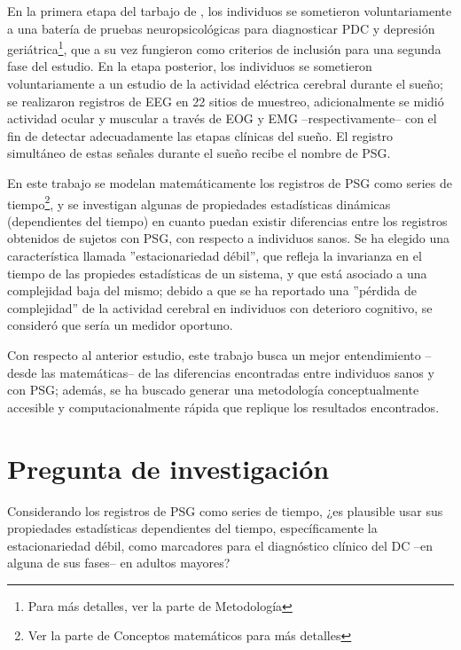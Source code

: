 En la primera etapa del tarbajo de \cite{VazquezTagle16},
los individuos se sometieron voluntariamente a una bater\'ia de pruebas
neuropsicol\'ogicas para diagnosticar PDC y depresi\'on geri\'atrica\footnote{Para
m\'as detalles, ver la parte de Metodolog\'ia}, que a su vez fungieron como criterios de
inclusi\'on para una segunda fase del estudio.
En la etapa posterior, los individuos se sometieron voluntariamente a un estudio de la
actividad el\'ectrica cerebral durante el
sue\~no; se realizaron
registros de EEG en 22 sitios de muestreo, adicionalmente se midi\'o
actividad ocular y muscular a trav\'es de EOG y EMG --respectivamente-- con
el fin de detectar adecuadamente las etapas cl\'inicas del sue\~no\cite{AASM07}.
El registro simult\'aneo de estas se\~nales durante el sue\~no recibe el nombre de PSG.

En este trabajo se modelan matem\'aticamente los registros de PSG como series de 
tiempo\footnote{Ver la parte de Conceptos matem\'aticos para m\'as detalles}, y se
investigan algunas de propiedades estad\'isticas din\'amicas (dependientes del tiempo)
en cuanto puedan existir diferencias entre los registros obtenidos de sujetos con PSG,
con respecto a individuos sanos. Se ha elegido una caracter\'istica
llamada ''estacionariedad d\'ebil'', que refleja la invarianza en el tiempo de las propiedes
estad\'isticas de un sistema, y que est\'a asociado a una complejidad baja del mismo; 
debido a que se ha reportado una ''p\'erdida de complejidad'' de la actividad cerebral
en individuos con deterioro cognitivo, se consider\'o que ser\'ia un medidor oportuno. 

Con respecto al anterior estudio, este trabajo busca un mejor
entendimiento --desde las matem\'aticas-- de las diferencias encontradas entre 
individuos sanos y con PSG; adem\'as, se ha buscado generar una metodolog\'ia 
conceptualmente accesible y computacionalmente r\'apida que replique los resultados encontrados.


\section{Pregunta de investigaci\'on}

Considerando los registros de PSG como series de tiempo,
¿es plausible usar sus propiedades estad\'isticas dependientes del tiempo, espec\'ificamente
la estacionariedad d\'ebil,
como marcadores para el diagn\'ostico cl\'inico del DC --en alguna de 
sus fases-- en adultos mayores?


